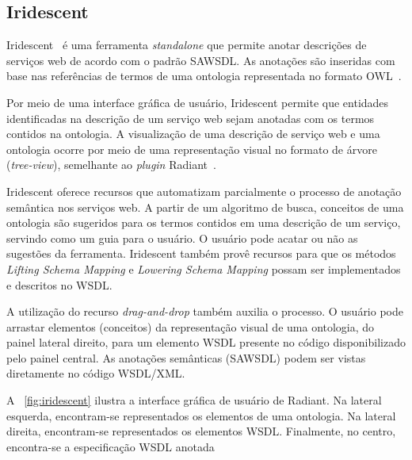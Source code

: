 \subsection{Iridescent}\label{2-fundamentacao-ferramentas-iridescent}

Iridescent~\cite{STAVROPOULOS-2013-Iridescent} é uma ferramenta \textit{standalone} que permite anotar descrições de serviços web de acordo com o padrão SAWSDL. As anotações são inseridas com base nas referências de termos de uma ontologia representada no formato OWL~\cite{W3C-2012-OWL}.

Por meio de uma interface gráfica de usuário, Iridescent permite que entidades identificadas na descrição de um serviço web sejam anotadas com os termos contidos na ontologia. A visualização de uma descrição de serviço web e uma ontologia ocorre por meio de uma representação visual no formato de árvore (\textit{tree-view}), semelhante ao \textit{plugin} Radiant~\cite{MILLER-VERMA-GOMADAM-SHETH-BREWER-2005-Radiant}.

Iridescent oferece recursos que automatizam parcialmente o processo de anotação semântica nos serviços web. A partir de um algoritmo de busca, conceitos de uma ontologia são sugeridos para os termos contidos em uma descrição de um serviço, servindo como um guia para o usuário. O usuário pode acatar ou não as sugestões da ferramenta. Iridescent também provê recursos para que os métodos \textit{Lifting Schema Mapping} e \textit{Lowering Schema Mapping} possam ser implementados e descritos no WSDL.

A utilização do recurso \textit{drag-and-drop} também auxilia o processo. O usuário pode arrastar elementos (conceitos) da representação visual de uma ontologia, do painel lateral direito, para um elemento WSDL presente no código disponibilizado pelo painel central. As anotações semânticas (SAWSDL) podem ser vistas diretamente no código WSDL/XML.


A \figurename~\ref{fig:iridescent} ilustra a interface gráfica de usuário de Radiant. Na lateral esquerda, encontram-se representados os elementos de uma ontologia. Na lateral direita, encontram-se representados os elementos WSDL. Finalmente, no centro, encontra-se a especificação WSDL anotada

